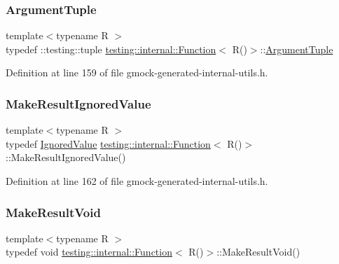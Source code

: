 \subsubsection{\texorpdfstring{Argument\+Tuple}{ArgumentTuple}}
{\footnotesize\ttfamily template$<$typename R $>$ \\
typedef \+::testing\+::tuple \hyperlink{structtesting_1_1internal_1_1Function}{testing\+::internal\+::\+Function}$<$ R()$>$\+::\hyperlink{structtesting_1_1internal_1_1Function_3_01R_07_08_4_ad483c3128c470d8cdb55c3ac1c575c11}{Argument\+Tuple}}



Definition at line 159 of file gmock-\/generated-\/internal-\/utils.\+h.

\mbox{\label{structtesting_1_1internal_1_1Function_3_01R_07_08_4_aa459093a5b52ef54e2544b5a6c054383}} 
\subsubsection{\texorpdfstring{Make\+Result\+Ignored\+Value}{MakeResultIgnoredValue}}
{\footnotesize\ttfamily template$<$typename R $>$ \\
typedef \hyperlink{classtesting_1_1internal_1_1IgnoredValue}{Ignored\+Value} \hyperlink{structtesting_1_1internal_1_1Function}{testing\+::internal\+::\+Function}$<$ R()$>$\+::Make\+Result\+Ignored\+Value()}



Definition at line 162 of file gmock-\/generated-\/internal-\/utils.\+h.

\mbox{\label{structtesting_1_1internal_1_1Function_3_01R_07_08_4_a666b5ad3bf155529d3a0f9fe6d5c897b}} 
\subsubsection{\texorpdfstring{Make\+Result\+Void}{MakeResultVoid}}
{\footnotesize\ttfamily template$<$typename R $>$ \\
typedef void \hyperlink{structtesting_1_1internal_1_1Function}{testing\+::internal\+::\+Function}$<$ R()$>$\+::Make\+Result\+Void()}



